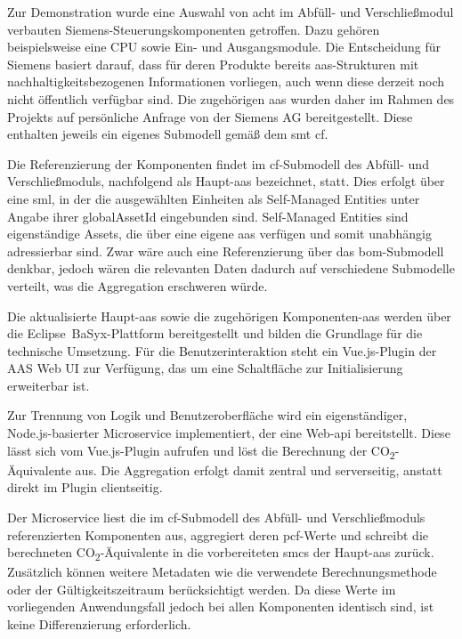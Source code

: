 Zur Demonstration wurde eine Auswahl von acht im Abfüll- und Verschließmodul verbauten Siemens-Steuerungskomponenten getroffen.
Dazu gehören beispielsweise eine CPU sowie Ein- und Ausgangsmodule.
Die Entscheidung für Siemens basiert darauf, dass für deren Produkte bereits \acs{aas}-Strukturen mit nachhaltigkeitsbezogenen Informationen vorliegen, auch wenn diese derzeit noch nicht öffentlich verfügbar sind.
Die zugehörigen \acs{aas} wurden daher im Rahmen des Projekts auf persönliche Anfrage von der Siemens AG bereitgestellt.
Diese enthalten jeweils ein eigenes Submodell gemäß dem \acs{smt} \acs{cf}.

\clearpage
Die Referenzierung der Komponenten findet im \acs{cf}-Submodell des Abfüll- und Verschließmoduls, nachfolgend als Haupt-\acs{aas} bezeichnet, statt.
Dies erfolgt über eine \acs{sml}, in der die ausgewählten Einheiten als Self-Managed Entities unter Angabe ihrer globalAssetId eingebunden sind.
Self-Managed Entities sind eigenständige Assets, die über eine eigene \acs{aas} verfügen und somit unabhängig adressierbar sind.
Zwar wäre auch eine Referenzierung über das \acs{bom}-Submodell denkbar, jedoch wären die relevanten Daten dadurch auf verschiedene Submodelle verteilt, was die Aggregation erschweren würde.

Die aktualisierte Haupt-\acs{aas} sowie die zugehörigen Komponenten-\acs{aas} werden über die Eclipse~BaSyx-Plattform bereitgestellt und bilden die Grundlage für die technische Umsetzung.
Für die Benutzerinteraktion steht ein Vue.js-Plugin der AAS Web UI zur Verfügung, das um eine Schaltfläche zur Initialisierung erweiterbar ist.

Zur Trennung von Logik und Benutzeroberfläche wird ein eigenständiger, Node.js-basierter Microservice implementiert, der eine Web-\acs{api} bereitstellt.
Diese lässt sich vom Vue.js-Plugin aufrufen und löst die Berechnung der CO\textsubscript{2}-Äquivalente aus.
Die Aggregation erfolgt damit zentral und serverseitig, anstatt direkt im Plugin clientseitig.

Der Microservice liest die im \acs{cf}-Submodell des Abfüll- und Verschließmoduls referenzierten Komponenten aus, aggregiert deren \acs{pcf}-Werte und schreibt die berechneten CO\textsubscript{2}-Äquivalente in die vorbereiteten \acsp{smc} der Haupt-\acs{aas} zurück.
Zusätzlich können weitere Metadaten wie die verwendete Berechnungsmethode oder der Gültigkeitszeitraum berücksichtigt werden.
Da diese Werte im vorliegenden Anwendungsfall jedoch bei allen Komponenten identisch sind, ist keine Differenzierung erforderlich.

